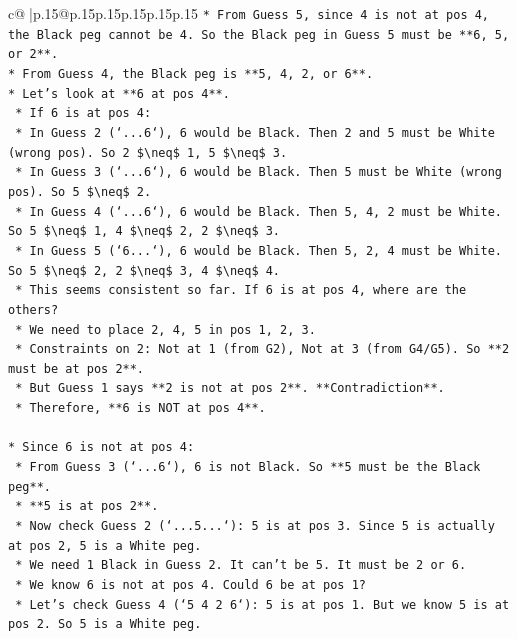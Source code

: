 \documentclass{article}
\begin{document}
{\begin{supertabular}{c@{$\;$}|p{.15\linewidth}@{}p{.15\linewidth}p{.15\linewidth}p{.15\linewidth}p{.15\linewidth}p{.15\linewidth}}
{{{\texttt{*   From Guess 5, since 4 is not at pos 4, the Black peg cannot be 4. So the Black peg in Guess 5 must be **6, 5, or 2**.} \\
\texttt{*   From Guess 4, the Black peg is **5, 4, 2, or 6**.} \\
\texttt{*   Let's look at **6 at pos 4**.} \\
\texttt{    *   If 6 is at pos 4:} \\
\texttt{        *   In Guess 2 (`...6`), 6 would be Black. Then 2 and 5 must be White (wrong pos). So 2 \$\textbackslash{}neq\$ 1, 5 \$\textbackslash{}neq\$ 3.} \\
\texttt{        *   In Guess 3 (`...6`), 6 would be Black. Then 5 must be White (wrong pos). So 5 \$\textbackslash{}neq\$ 2.} \\
\texttt{        *   In Guess 4 (`...6`), 6 would be Black. Then 5, 4, 2 must be White. So 5 \$\textbackslash{}neq\$ 1, 4 \$\textbackslash{}neq\$ 2, 2 \$\textbackslash{}neq\$ 3.} \\
\texttt{        *   In Guess 5 (`6...`), 6 would be Black. Then 5, 2, 4 must be White. So 5 \$\textbackslash{}neq\$ 2, 2 \$\textbackslash{}neq\$ 3, 4 \$\textbackslash{}neq\$ 4.} \\
\texttt{        *   This seems consistent so far. If 6 is at pos 4, where are the others?} \\
\texttt{        *   We need to place 2, 4, 5 in pos 1, 2, 3.} \\
\texttt{        *   Constraints on 2: Not at 1 (from G2), Not at 3 (from G4/G5). So **2 must be at pos 2**.} \\
\texttt{        *   But Guess 1 says **2 is not at pos 2**. **Contradiction**.} \\
\texttt{    *   Therefore, **6 is NOT at pos 4**.} \\
\\ 
\texttt{*   Since 6 is not at pos 4:} \\
\texttt{    *   From Guess 3 (`...6`), 6 is not Black. So **5 must be the Black peg**.} \\
\texttt{    *   **5 is at pos 2**.} \\
\texttt{    *   Now check Guess 2 (`...5...`): 5 is at pos 3. Since 5 is actually at pos 2, 5 is a White peg.} \\
\texttt{    *   We need 1 Black in Guess 2. It can't be 5. It must be 2 or 6.} \\
\texttt{    *   We know 6 is not at pos 4. Could 6 be at pos 1?} \\
\texttt{    *   Let's check Guess 4 (`5 4 2 6`): 5 is at pos 1. But we know 5 is at pos 2. So 5 is a White peg.} \\
}}}
\end{supertabular}}
\end{document}
